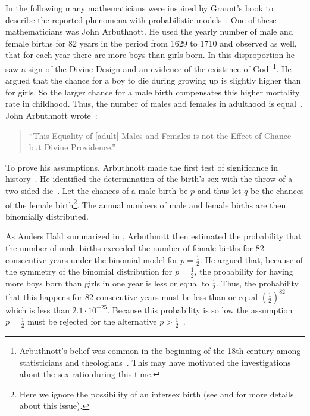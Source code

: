 In the following many mathematicians were inspired by Graunt's book to describe the reported phenomena with probabilistic models~\cite[p. 275]{hald1}. One of these mathematicians was John Arbuthnott. He used the yearly number of male and female births for 82 years in the period from 1629 to 1710 and observed as well, that for each year there are more boys than girls born. In this disproportion he saw a sign of the Divine Design and an evidence of the existence of God~\cite[p. 277]{hald1}\footnote{Arbuthnott's belief was common in the beginning of the 18th century among statisticians and theologians~\cite[p.~285]{hald1}. This may have motivated the investigations about the sex ratio during this time.}. He argued that the chance for a boy to die during growing up is slightly higher than for girls. So the larger chance for a male birth compensates this higher mortality rate in childhood. Thus, the number of males and females in adulthood is equal~\cite[p. 277]{hald1}. John Arbuthnott wrote~\cite[p. 275]{hald1}:

\begin{quote}
    ``This Equality of [adult] Males and Females is not the Effect of Chance but Divine Providence.''
\end{quote}


To prove his assumptions, Arbuthnott made the first test of significance in history~\cite[p. 276]{hald1}. He identified the determination of the birth's sex with the throw of a two sided die~\cite[pp. 275-276]{hald1}. Let the chances of a male birth be $p$ and thus let $q$ be the chances of the female birth\footnote{Here we ignore the possibility of an intersex birth (see \cite{wiki:intersex} and \cite{wiki:transgender} for more details about this issue).}. The annual numbers of male and female births are then binomially distributed.

As Anders Hald summarized in \cite[p. 278]{hald1}, Arbuthnott then estimated the probability that the number of male births exceeded the number of female births for 82 consecutive years under the binomial model for $p=\tfrac 12$. He argued that, because of the symmetry of the binomial distribution for $p=\tfrac 12$, the probability for having more boys born than girls in one year is less or equal to $\tfrac 12$. Thus, the probability that this happens for 82 consecutive years must be less than or equal $\left(\tfrac 12\right)^{82}$ which is less than $2.1\cdot 10^{-25}$. Because this probability is so low the assumption $p=\tfrac 12$ must be rejected for the alternative $p > \tfrac 12$~\cite[p. 278]{hald1}.

